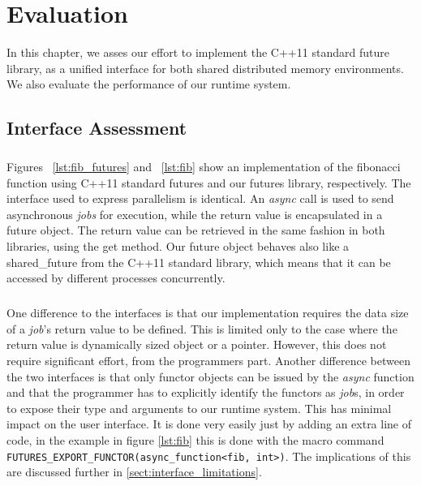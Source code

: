 \chapter{Evaluation}
\label{chap:evaluation}
	In this chapter, we asses our effort to implement the C++11 standard future library, as 
a unified interface for both shared distributed memory environments.  We also evaluate the performance of our runtime system.

\section{Interface Assessment}
\label{sect:interface_assesment}

\paragraph{}
Figures ~\ref{lst:fib_futures} and ~\ref{lst:fib} show an implementation of the fibonacci function using
C++11 standard futures and our futures library, respectively.  The interface used to express parallelism is
identical.  An \emph{async} call is used to send asynchronous \emph{jobs} for execution, while the return value
is encapsulated in a future object.  The return value can be retrieved in the same fashion in both libraries, 
using the get method.  Our future object behaves also like a shared\_future from the C++11 standard library,
which means that it can be accessed by different processes concurrently.  

\paragraph{}
One difference to the interfaces is that our implementation requires the data size of a \emph{job}'s return 
value to be defined.  This is limited only to the case where the return value is dynamically sized object
or a pointer.  However, this does not require significant effort, from the programmers part.
Another  difference between the two interfaces is that only functor objects can be 
issued by the \emph{async} function and that the programmer has to explicitly identify the functors
as \emph{job}s, in order to expose their type and arguments to our runtime system.  This has minimal impact on
the user interface.  It is done very easily just by adding an extra line of code, in the example in figure 
\ref{lst:fib} this is done with the macro command \texttt{FUTURES\_EXPORT\_FUNCTOR(async\_function<fib, int>)}.  
The implications of this are discussed further in \ref{sect:interface_limitations}.  

